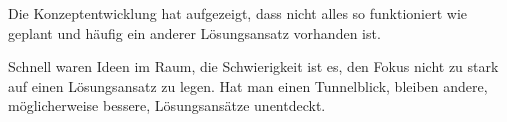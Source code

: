 \documentclass[../main.tex]{subfiles}
\begin{document}
Die Konzeptentwicklung hat aufgezeigt, dass nicht alles so funktioniert wie geplant und häufig ein anderer Lösungsansatz vorhanden ist. 

Schnell waren Ideen im Raum, die Schwierigkeit ist es, den Fokus nicht zu stark auf einen Lösungsansatz zu legen. Hat man einen Tunnelblick, bleiben andere, möglicherweise bessere, Lösungsansätze unentdeckt. 
\end{document}
